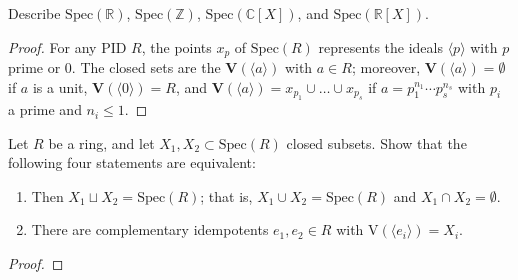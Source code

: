 \begin{exr}
    Describe \(\mathrm{Spec}(\mathbb{R})\), \(\mathrm{Spec}(\mathbb{Z})\), \(\mathrm{Spec}(\mathbb{C}[X])\), and \(\mathrm{Spec}(\mathbb{R}[X])\).
\end{exr}
\begin{proof}
    For any PID \(R\), the points \(x_p\) of \(\mathrm{Spec}(R)\) represents the ideals \(\langle p \rangle\) with \(p\) prime or \(0\). The closed sets are the \(\mathbf{V}(\langle a \rangle)\) with \(a \in R\); moreover, \(\mathbf{V}(\langle a \rangle) = \emptyset\) if \(a\) is a unit, \(\mathbf{V}(\langle 0 \rangle) = R\), and \(\mathbf{V}(\langle a \rangle) = x_{p_1} \cup \ldots \cup x_{p_s}\) if \(a = p_1^{n_1} \cdots p_s^{n_s}\) with \(p_i\) a prime and \(n_i \leq 1\).
\end{proof}
\begin{exr}
    Let \(R\) be a ring, and let \(X_1, X_2 \subset \mathrm{Spec}(R)\) closed subsets. Show that the following four statements are equivalent:
    \begin{enumerate}
        \item Then \(X_1 \sqcup X_2 = \mathrm{Spec}(R)\); that is, \(X_1 \cup X_2 = \mathrm{Spec}(R)\) and \(X_1 \cap X_2 = \emptyset\).
        \item There are complementary idempotents \(e_1, e_2 \in R\) with \(\mathrm{V}(\langle e_i \rangle) = X_i\).
    \end{enumerate}
\end{exr}
\begin{proof}
    
\end{proof}